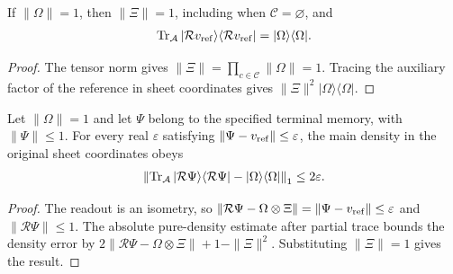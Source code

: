 \begin{lemma}
    \label{thm:chain_terminal_reference_density}
    \leanok
    If $\|\Omega\|=1$, then $\|\Xi\|=1$, including when
    $\mathcal C=\varnothing$, and
    \begin{align}
        \operatorname{Tr}_{\mathcal A}
        |\mathcal Rv_{\rm ref}\rangle\langle\mathcal Rv_{\rm ref}|
        =|\Omega\rangle\langle\Omega|.\notag
    \end{align}
\end{lemma}
\begin{proof}\leanok
    The tensor norm gives $\|\Xi\|=\prod_{c\in\mathcal C}\|\Omega\|=1$.
    Tracing the auxiliary factor of the reference in sheet coordinates
    gives $\|\Xi\|^2|\Omega\rangle\langle\Omega|$.
\end{proof}

\begin{lemma}
    \label{thm:chain_terminal_reference_error}
    \leanok
    Let $\|\Omega\|=1$ and let $\Psi$ belong to the specified terminal
    memory, with $\|\Psi\|\le1$. For every real $\varepsilon$ satisfying
    $\|\Psi-v_{\rm ref}\|\le\varepsilon$, the main density in the
    original sheet coordinates obeys
    \begin{align}
        \left\|\operatorname{Tr}_{\mathcal A}
        |\mathcal R\Psi\rangle\langle\mathcal R\Psi|
        -|\Omega\rangle\langle\Omega|\right\|_1
        \le2\varepsilon.\notag
    \end{align}
\end{lemma}
\begin{proof}\leanok
    The readout is an isometry, so
    $\|\mathcal R\Psi-\Omega\otimes\Xi\|
        =\|\Psi-v_{\rm ref}\|\le\varepsilon$ and $\|\mathcal R\Psi\|\le1$.
    The absolute pure-density estimate after partial trace bounds the
    density error by
    $2\|\mathcal R\Psi-\Omega\otimes\Xi\|+1-\|\Xi\|^2$.
    Substituting $\|\Xi\|=1$ gives the result.
\end{proof}

